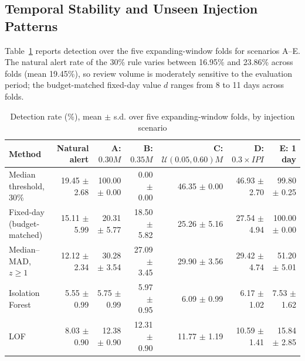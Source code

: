 \documentclass[conference]{IEEEtran}
\begin{document}
\subsection{Temporal Stability and Unseen Injection Patterns}
Table~\ref{tab:rolling} reports detection over the five expanding-window folds for scenarios A--E. The natural alert rate of the 30\% rule varies between 16.95\% and 23.86\% across folds (mean 19.45\%), so review volume is moderately sensitive to the evaluation period; the budget-matched fixed-day value $d$ ranges from 8 to 11 days across folds.

\begin{table}[t]
\caption{Detection rate (\%), mean $\pm$ s.d. over five expanding-window folds, by injection scenario}
\label{tab:rolling}
\centering
\footnotesize
\begin{tabular}{lrrrrrr}
\toprule
\textbf{Method} & \textbf{Natural alert} & \textbf{A: $0.30M$} & \textbf{B: $0.35M$} & \textbf{C: $\mathcal{U}(0.05,0.60)M$} & \textbf{D: $0.3\times IPI$} & \textbf{E: 1 day}\\
\midrule
Median threshold, 30\% & 19.45 $\pm$ 2.68 & 100.00 $\pm$ 0.00 & 0.00 $\pm$ 0.00 & 46.35 $\pm$ 0.00 & 46.93 $\pm$ 2.70 & 99.80 $\pm$ 0.25\\
Fixed-day (budget-matched) & 15.11 $\pm$ 5.99 & 20.31 $\pm$ 5.77 & 18.50 $\pm$ 5.82 & 25.26 $\pm$ 5.16 & 27.54 $\pm$ 4.94 & 100.00 $\pm$ 0.00\\
Median--MAD, $z\geq1$ & 12.12 $\pm$ 2.34 & 30.28 $\pm$ 3.54 & 27.09 $\pm$ 3.45 & 29.90 $\pm$ 3.56 & 29.42 $\pm$ 4.74 & 51.20 $\pm$ 5.01\\
Isolation Forest & 5.55 $\pm$ 0.99 & 5.75 $\pm$ 0.99 & 5.97 $\pm$ 0.95 & 6.09 $\pm$ 0.99 & 6.17 $\pm$ 1.02 & 7.53 $\pm$ 1.62\\
LOF & 8.03 $\pm$ 0.90 & 12.38 $\pm$ 0.90 & 12.31 $\pm$ 0.90 & 11.77 $\pm$ 1.19 & 10.59 $\pm$ 1.41 & 15.84 $\pm$ 2.85\\
\bottomrule
\end{tabular}
\end{table}
\end{document}
